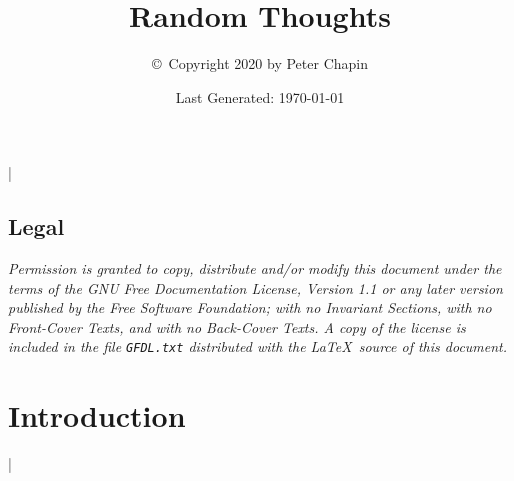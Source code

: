 \documentclass{scrreprt}
\begin{document}
\title{Random Thoughts}
\author{\copyright\ Copyright 2020 by Peter Chapin}
\date{Last Generated: \today}
\maketitle

\tableofcontents

\lstMakeShortInline|

\section*{Legal}
\label{sec:legal}

\textit{Permission is granted to copy, distribute and/or modify this document under the terms of
  the GNU Free Documentation License, Version 1.1 or any later version published by the Free
  Software Foundation; with no Invariant Sections, with no Front-Cover Texts, and with no
  Back-Cover Texts. A copy of the license is included in the file \texttt{GFDL.txt} distributed
  with the \LaTeX\ source of this document.}

\chapter{Introduction}
\label{chapt:introduction}






\newpage


\lstDeleteShortInline|




\end{document}
